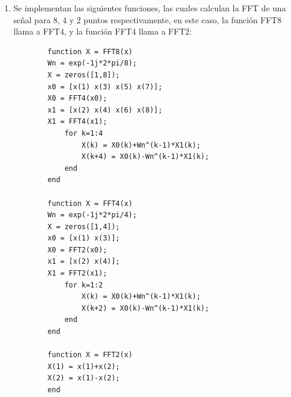 \documentclass[letterpaper,onecolumn,10pt,journal,final]{IEEEtran}
\begin{document}
\begin{enumerate}[1)]
    \item %
    Se implementan las siguientes funciones, las cuales calculan la FFT de una señal para 8, 4 y 2 puntos respectivamente, en este caso, la función FFT8 llama a FFT4, y la función FFT4 llama a FFT2:
    \begin{lstlisting}
        function X = FFT8(x)
        Wn = exp(-1j*2*pi/8);
        X = zeros([1,8]);
        x0 = [x(1) x(3) x(5) x(7)];
        X0 = FFT4(x0);
        x1 = [x(2) x(4) x(6) x(8)];
        X1 = FFT4(x1);
            for k=1:4
                X(k) = X0(k)+Wn^(k-1)*X1(k);
                X(k+4) = X0(k)-Wn^(k-1)*X1(k);
            end
        end
        
        function X = FFT4(x)
        Wn = exp(-1j*2*pi/4);
        X = zeros([1,4]);
        x0 = [x(1) x(3)];
        X0 = FFT2(x0);
        x1 = [x(2) x(4)];
        X1 = FFT2(x1);
            for k=1:2
                X(k) = X0(k)+Wn^(k-1)*X1(k);
                X(k+2) = X0(k)-Wn^(k-1)*X1(k);
            end
        end
        
        function X = FFT2(x)
        X(1) = x(1)+x(2);
        X(2) = x(1)-x(2);
        end


\end{lstlisting}
\end{enumerate}
\end{document}
